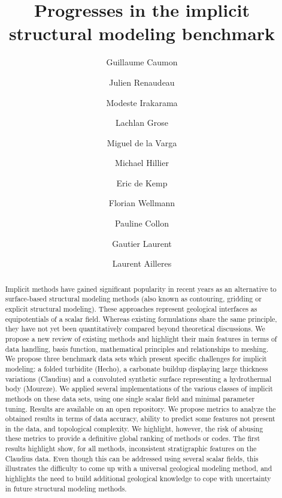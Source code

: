 \documentclass[preprint]{ring20}
\title{Progresses in the implicit structural modeling benchmark}
\author[1]{Guillaume Caumon}
\author[1,2]{Julien Renaudeau}
\author[1]{Modeste Irakarama}
\author[3]{Lachlan Grose}
\author[5]{Miguel de la Varga}
\author[6]{Michael Hillier}
\author[6]{Eric de Kemp}
\author[5]{Florian Wellmann}
\author[1]{Pauline Collon}
\author[4]{Gautier Laurent}
\author[3]{Laurent Ailleres}
\affil[1]{RING, GeoRessources / ENSG, Universit\'e de Lorraine / CNRS, France}
\affil[2]{Schlumberger, France}
\affil[3]{Monash University, Australia}
\affil[4]{Univ. Orl\'eans, CNRS, BRGM, ISTO, France}
\affil[5]{RWTH Aachen, Germany}
\affil[6]{NRCan, Canada}
\begin{document}
\maketitle

\begin{abstract}

Implicit methods have gained significant popularity in recent years as 
an alternative to surface-based structural modeling methods (also known as 
contouring, gridding or explicit structural modeling). These approaches represent 
geological interfaces as equipotentials of a scalar field. 
Whereas existing formulations share the same principle, they have not yet been 
quantitatively compared beyond theoretical discussions. We propose a new review 
 of existing methods and highlight their main features in terms 
of data handling, basis function, mathematical principles and relationships to 
meshing. We propose three benchmark data sets which present specific 
challenges for implicit modeling: a folded turbidite (Hecho), a carbonate buildup 
displaying large thickness variations (Claudius) and a convoluted synthetic surface 
representing a hydrothermal body (Moureze). We applied several implementations of the 
various classes of implicit methods on these data sets, using one single scalar field and minimal parameter 
tuning. Results are available on an open repository. We propose metrics to analyze 
the obtained results in terms of data accuracy, ability to predict 
some features not present in the data, and topological complexity. 
We highlight, however, the risk of abusing these metrics to provide a definitive 
global ranking of methods or codes. 
The first results highlight show, for all methods, inconsistent stratigraphic features 
on the Claudius data. Even though this can be addressed using several scalar fields, 
this illustrates the difficulty to come up with a universal geological 
modeling method, and highlights the need to build additional geological 
knowledge to cope with uncertainty in future structural modeling methods.  

\end{abstract}



\end{document}
